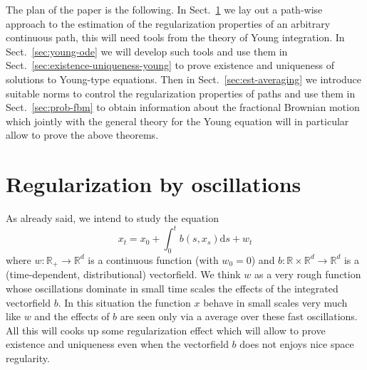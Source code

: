 \documentclass[11pt,a4paper,draft,reqno]{amsart}
\theoremstyle{definition}
\newcommand{\RR}{\mathbb{R}}
\newcommand{\dd}{\mathrm{d}}
\begin{document}
\bigskip
The plan of the paper is the following. In Sect.~\ref{sec:reg} we lay out a path-wise approach to the estimation of the regularization properties of an arbitrary continuous path, this will need tools from the theory of Young integration. In Sect.~\ref{sec:young-ode} we will develop such tools and use them in Sect.~\ref{sec:existence-uniqueness-young} to prove existence and uniqueness of solutions to Young-type equations. Then in Sect.~\ref{sec:est-averaging} we introduce suitable norms to control the regularization properties of paths and use them in Sect.~\ref{sec:prob-fbm} to obtain information about the fractional Brownian motion which jointly with the general theory for the Young equation will in particular allow to prove the above theorems. 



\section{Regularization by oscillations}
\label{sec:reg}

As already said, we intend to study the equation
\begin{equation*}
x_t=x_0 + \int_0^t b(s,x_s)\dd s + w_t
\end{equation*}
where $w:\RR_+\to\RR^d$ is a continuous function (with $w_0=0$) and $b:\RR\times\RR^d\to\RR^d$ is a (time-dependent, distributional) vectorfield. We think $w$ as a very rough function whose oscillations dominate in small time scales the effects of the integrated vectorfield $b$. In this situation the function $x$ behave in small scales very much like $w$ and the effects of $b$ are seen only via a average over these fast oscillations. All this will cooks up some regularization effect which will allow to prove existence and uniqueness even when the vectorfield $b$ does not enjoys  nice space regularity. 
\end{document}
